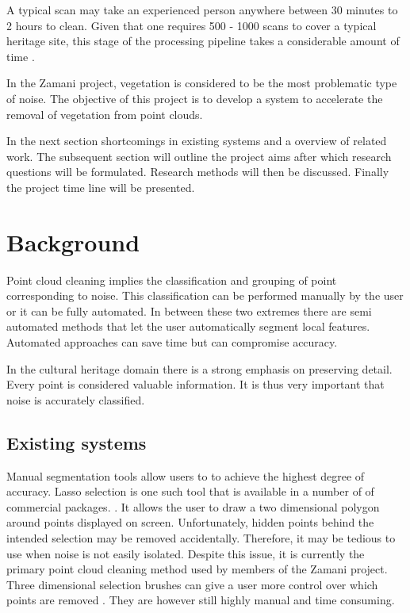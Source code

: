 \documentclass[10pt,twocolumn]{article}
\begin{document}
A typical scan may take an experienced person anywhere between 30 minutes to 2 hours to clean. Given that one requires 500 - 1000 scans to cover a typical heritage site, this stage of the processing pipeline takes a considerable amount of time \cite{Ruther2011}.

In the Zamani project, vegetation is considered to be the most problematic type of noise. The objective of this project is to develop a system to accelerate the removal of vegetation from point clouds.

In the next section shortcomings in existing systems and a overview of related work. The subsequent section will outline the project aims after which research questions will be formulated. Research methods will then be discussed. Finally the project time line will be presented.

\section{Background}

Point cloud cleaning implies the classification and grouping of point corresponding to noise. This classification can be performed manually by the user or it can be fully automated. In between these two extremes there are semi automated methods that let the user automatically segment local features. Automated approaches can save time but can compromise accuracy.

In the cultural heritage domain there is a strong emphasis on preserving detail. Every point is considered valuable information. It is thus very important that noise is accurately classified.

\subsection{Existing systems}
Manual segmentation tools allow users to to achieve the highest degree of accuracy. Lasso selection is one such tool that is available in a number of of commercial packages. \cite{Pointools2012,Leica2012,Technodigit2012}. It allows the user to draw a two dimensional polygon around points displayed on screen. Unfortunately, hidden points behind the intended selection may be removed accidentally. Therefore, it may be tedious to use when noise is not easily isolated. Despite this issue, it is currently the primary point cloud cleaning method used by members of the Zamani project. Three dimensional selection brushes can give a user more control over which points are removed \cite{Pointools2012}. They are however still highly manual and time consuming.
\end{document}

